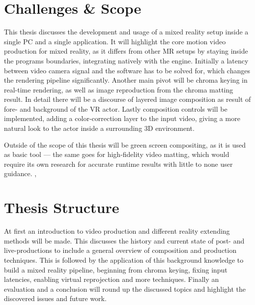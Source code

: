 \section{Challenges \& Scope}
\label{sec:intro:challenges}

This thesis discusses the development and usage of a mixed reality setup inside 
a single PC and a single application.
\newline
It will highlight the core motion video production for mixed reality, as it 
differs from other MR setups by staying inside the programs boundaries, 
integrating natively with the engine. Initially a latency between video camera 
signal and the software has to be solved for, which changes the rendering 
pipeline significantly.
\newline
Another main pivot will be chroma keying in real-time rendering, as well as 
image reproduction from the chroma matting result. In detail there will be a 
discourse of layered image composition as result of fore- and background of the 
VR actor.
\newline
Lastly composition controls will be implemented, adding a color-correction 
layer to the input video, giving a more natural look to the actor inside a 
surrounding 3D environment.

Outside of the scope of this thesis will be green screen compositing, as it is 
used as basic tool --- the same goes for high-fidelity video matting, which 
would require its own research for accurate runtime results with little to none 
user guidance. 
\cite{gong:realtime-matting:2010}, \cite{gastal:shared-sampling:2010}

\section{Thesis Structure}
\label{sec:intro:structure}

At first an introduction to video production and different reality extending 
methods will be made. This discusses the history and current state of post- and 
live-productions to include a general overview of composition and production 
techniques.
\newline
This is followed by the application of this background knowledge to build a 
mixed reality pipeline, beginning from chroma keying, fixing input latencies, 
enabling virtual reprojection and more techniques.
\newline
Finally an evaluation and a conclusion will round up the discussed topics and 
highlight the discovered issues and future work.


